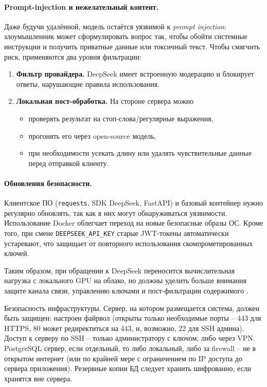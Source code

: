 \paragraph{Prompt-injection и нежелательный контент.}
Даже будучи удалённой, модель остаётся уязвимой к \emph{prompt injection}: злоумышленник может сформулировать
вопрос так, чтобы обойти системные инструкции и получить приватные данные или токсичный текст.
Чтобы смягчить риск, применяются два уровня фильтрации:

\begin{enumerate}[label=\arabic*]
  \item \textbf{Фильтр провайдера.} DeepSeek имеет встроенную модерацию и блокирует ответы, нарушающие правила использования.
  \item \textbf{Локальная пост-обработка.}  На стороне сервера можно
        \begin{itemize}
          \item проверять результат на стоп-слова/регулярные выражения,
          \item прогонять его через open-source модель,
          \item при необходимости усекать длину или удалять чувствительные данные перед отправкой клиенту.
        \end{itemize}
\end{enumerate}

\paragraph{Обновления безопасности.}
Клиентское ПО (\texttt{requests}, SDK DeepSeek, FastAPI) и базовый контейнер
нужно регулярно обновлять, так как в них могут обнаруживаться уязвимости.
Использование Docker облегчает переход на новые безопасные образы ОС.
Кроме того, при смене \texttt{DEEPSEEK\_API\_KEY} старые JWT-токены автоматически устаревают,
что защищает от повторного использования скомпрометированных ключей.

Таким образом, при обращении к DeepSeek переносится вычислительная нагрузка
с локального GPU на облако, но должны уделить больше внимания защите канала связи,
управлению ключами и пост-фильтрации содержимого \cite{deepseek:docs}.

Безопасность инфраструктуры. Сервер, на котором размещается система, должен быть защищен: настроен файрвол (открыты только необходимые порты – 443 для HTTPS, 80 может редиректиться на 443, и, возможно, 22 для SSH админа). Доступ к серверу по SSH – только администратору с ключом, либо через VPN. PostgreSQL сервер, если отдельный, то либо локальный, либо за firewall – не в открытом интернет (или по крайней мере с ограничением по IP доступа до сервера приложения). Резервные копии БД следует хранить шифрованно, если хранятся вне сервера.

